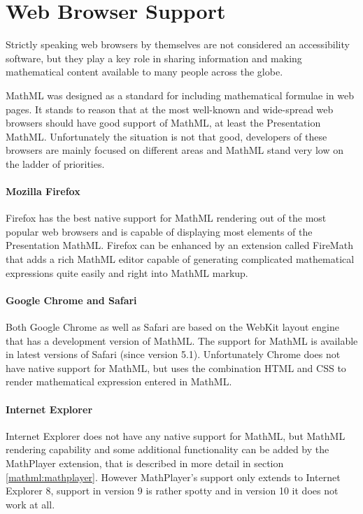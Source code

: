 \documentclass[11pt,oneside,final]{fithesis2}
\begin{document}
\section{Web Browser Support}
Strictly speaking web browsers by themselves are not considered an accessibility software, but they play a key role in sharing information and making mathematical content available to many people across the globe.

MathML was designed as a standard for including mathematical formulae in web pages. It stands to reason that at the most well-known and wide-spread web browsers should have good support of MathML, at least the Presentation MathML. Unfortunately the situation is not that good, developers of these browsers are mainly focused on different areas and MathML stand very low on the ladder of priorities.

\paragraph*{Mozilla Firefox} 
Firefox has the best native support for MathML rendering out of the most popular web browsers and is capable of displaying most elements of the Presentation MathML. Firefox can be enhanced by an extension called FireMath that adds a rich MathML editor capable of generating complicated mathematical expressions quite easily and right into MathML markup.

\paragraph*{Google Chrome and Safari}
Both Google Chrome as well as Safari are based on the WebKit layout engine that has a development version of MathML. The support for MathML is available in latest versions of Safari (since version 5.1). Unfortunately Chrome does not have native support for MathML, but uses the combination HTML and CSS to render mathematical expression entered in MathML.

\paragraph*{Internet Explorer}
Internet Explorer does not have any native support for MathML, but MathML rendering capability and some additional functionality can be added by the MathPlayer extension, that is described in more detail in section \ref{mathml:mathplayer}. However MathPlayer's support only extends to Internet Explorer 8, support in version 9 is rather spotty and in version 10 it does not work at all.
\end{document}
